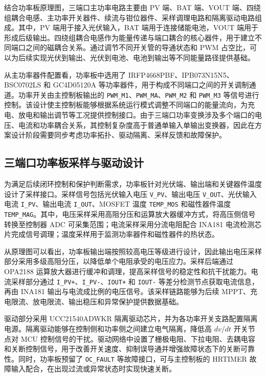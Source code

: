 结合功率板原理图，三端口主功率电路主要由 PV 端、BAT 端、VOUT 端、四绕组耦合电感、主功率开关器件、续流与钳位器件、采样调理电路和隔离驱动电路组成。其中，PV 端用于接入光伏输入，BAT 端用于连接储能电池，VOUT 端用于形成后级输出。四绕组耦合电感作为能量传递与端口耦合的核心器件，用于建立不同端口之间的磁耦合关系。通过调节不同开关管的导通状态和 PWM 占空比，可以为后续实现光伏到输出、光伏到电池、电池到输出等不同能量路径提供基础。

从主功率器件配置看，功率板中选用了 IRFP4668PBF、IPB073N15N5、BSC0702LS 和 GC4D05120A 等功率器件，用于构成不同端口之间的开关调制通道。功率开关由主控制板输出的 \texttt{PWM\_M1}、\texttt{PWM\_MA}、\texttt{PWM\_M2} 和 \texttt{PWM\_M3} 等信号进行控制。该设计使主控制板能够根据系统运行模式调整不同端口的能量流向，为充电、放电和输出调节等工况提供控制接口。由于三端口功率变换涉及多个端口的电压、电流和功率耦合关系，其控制复杂度高于普通单输入单输出变换器，因此在方案设计阶段需要同步考虑功率拓扑、驱动隔离、采样反馈和故障保护。




\subsection{三端口功率板采样与驱动设计}

为满足后续闭环控制和保护判断需求，功率板针对光伏端、输出端和关键器件温度设计了采样接口。采样信号包括光伏输入电压 \texttt{V\_PV}、输出电压 \texttt{V\_OUT}、光伏输入电流 \texttt{I\_PV}、输出电流 \texttt{I\_OUT}、MOSFET 温度 \texttt{TEMP\_MOS} 和磁性器件温度 \texttt{TEMP\_MAG}。其中，电压采样采用高阻分压和运算放大器缓冲方式，将高压侧信号转换至控制器 ADC 可采集范围；电流采样采用分流电阻配合 INA181 电流检测芯片完成信号调理；温度采样用于监测功率器件和磁性器件的热状态。

从原理图可以看出，功率板输出端按照较高电压等级进行设计，因此输出电压采样部分采用多级高阻分压，以降低单个电阻承受的电压应力。采样后端通过 OPA2188 运算放大器进行缓冲和调理，提高采样信号的稳定性和抗干扰能力。电流采样部分通过 \texttt{I\_PV+}、\texttt{I\_PV-}、\texttt{IOUT+} 和 \texttt{IOUT-} 等差分检测节点获取电流信息，再由 INA181 输出与电流成比例的电压信号。该采样链路能够为后续 MPPT、充电限流、放电限流、输出稳压和异常保护提供数据基础。

驱动部分采用 UCC21540ADWKR 隔离驱动芯片，并为各功率开关支路配置隔离电源。隔离驱动能够在控制侧和功率侧之间建立电气隔离，降低高 $dv/dt$ 开关节点对 MCU 控制信号的干扰。驱动网络中设置了栅极电阻、下拉电阻、去耦电容和关断控制信号，用于改善开关速度、抑制误导通并增强故障状态下的关断可靠性。同时，功率板预留了 \texttt{OC\_FAULT} 等故障接口，可与主控制板的 HRTIMER 故障输入配合，在出现过流或异常状态时实现快速关断。

